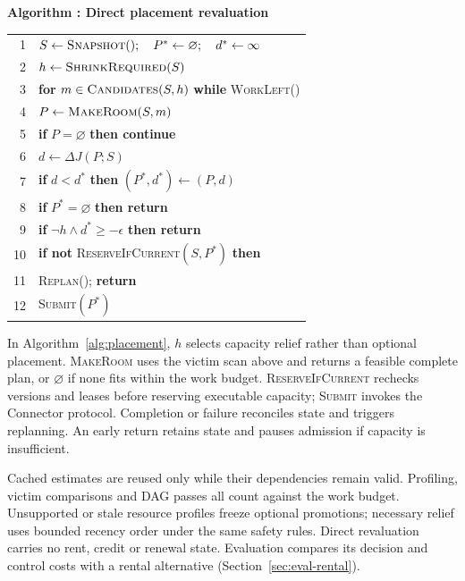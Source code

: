 \par\medskip\noindent\begin{minipage}{\columnwidth}
\raggedright
 \label{alg:placement}
 \textbf{Algorithm \thedesignalgorithm: Direct placement revaluation}
 \par\smallskip
 \begin{tabularx}{\columnwidth}{@{}r@{\quad}X@{}}
 \toprule
 1 & $S\gets\textsc{Snapshot}();\quad P^*\gets\varnothing;\quad d^*\gets\infty$ \\
 2 & $h\gets\textsc{ShrinkRequired}(S)$ \\
 3 & \textbf{for} $m\in\textsc{Candidates}(S,h)$ \textbf{while} \textsc{WorkLeft}() \\
 4 & \quad $P\gets\textsc{MakeRoom}(S,m)$ \\
 5 & \quad \textbf{if} $P=\varnothing$ \textbf{then continue} \\
 6 & \quad $d\gets\Delta J(P;S)$ \\
 7 & \quad \textbf{if} $d<d^*$ \textbf{then} $(P^*,d^*)\gets(P,d)$ \\
 8 & \textbf{if} $P^*=\varnothing$ \textbf{then return} \\
 9 & \textbf{if} $\neg h\land d^*\ge-\epsilon$ \textbf{then return} \\
 10 & \textbf{if not} \textsc{ReserveIfCurrent}$(S,P^*)$ \textbf{then} \\
 11 & \quad \textsc{Replan}(); \textbf{return} \\
 12 & \textsc{Submit}$(P^*)$ \\
 \bottomrule
 \end{tabularx}
\end{minipage}\par\medskip

In Algorithm~\ref{alg:placement}, $h$ selects capacity relief rather than
optional placement. \textsc{MakeRoom} uses the victim scan above and returns
a feasible complete plan, or $\varnothing$ if none fits within the work
budget. \textsc{ReserveIfCurrent} rechecks versions and leases before
reserving executable capacity; \textsc{Submit} invokes the Connector
protocol. Completion or failure reconciles state and triggers replanning.
An early return retains state and pauses admission if capacity is insufficient.

Cached estimates are reused only while their dependencies remain valid.
Profiling, victim comparisons and DAG passes all count against the work
budget. Unsupported or stale resource profiles freeze optional promotions;
necessary relief uses bounded recency order under the same safety rules.
Direct revaluation carries no rent, credit or renewal state. Evaluation
compares its decision and control costs with a rental alternative
(Section~\ref{sec:eval-rental}).

